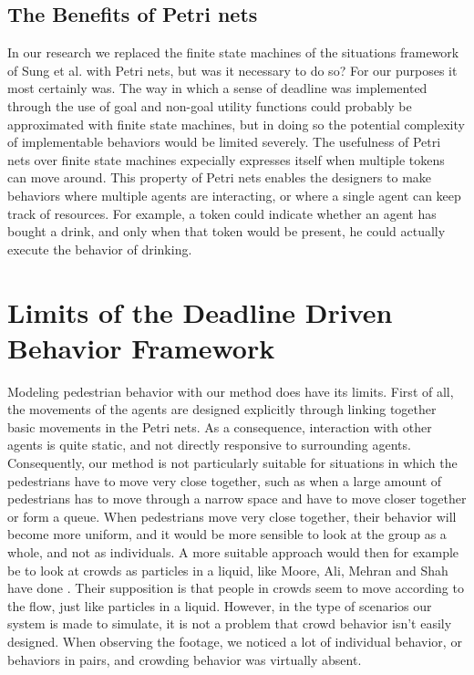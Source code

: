 \documentclass[11pt, a4paper]{book}
\begin{document}
\subsection{The Benefits of Petri nets}
\label{sec:benefits}
In our research we replaced the finite state machines of the situations framework of Sung et al. with Petri nets, but was it necessary to do so? For our purposes it most certainly was. The way in which a sense of deadline was implemented through the use of goal and non-goal utility functions could probably be approximated with finite state machines, but in doing so the potential complexity of implementable behaviors would be limited severely. The usefulness of Petri nets over finite state machines expecially expresses itself when multiple tokens can move around. This property of Petri nets enables the designers to make behaviors where multiple agents are interacting, or where a single agent can keep track of resources. For example, a token could indicate whether an agent has bought a drink, and only when that token would be present, he could actually execute the behavior of drinking.

%
%
%


\section{Limits of the Deadline Driven Behavior Framework}
Modeling pedestrian behavior with our method does have its limits. First of all, the movements of the agents are designed explicitly through linking together basic movements in the Petri nets. As a consequence, interaction with other agents is quite static, and not directly responsive to surrounding agents. Consequently, our method is not particularly suitable for situations in which the pedestrians have to move very close together, such as when a large amount of pedestrians has to move through a narrow space and have to move closer together or form a queue. When pedestrians move very close together, their behavior will become more uniform, and it would be more sensible to look at the group as a whole, and not as individuals. A more suitable approach would then for example be to look at crowds as particles in a liquid, like Moore, Ali, Mehran and Shah have done \cite{Moore:2011:VCS:2043174.2043192}. Their supposition is that people in crowds seem to move according to the flow, just like particles in a liquid. However, in the type of scenarios our system is made to simulate, it is not a problem that crowd behavior isn't easily designed. When observing the footage, we noticed a lot of individual behavior, or behaviors in pairs, and crowding behavior was virtually absent.\\
\end{document}
